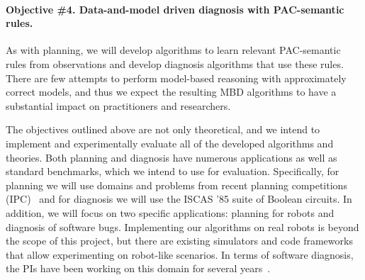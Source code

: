 \documentclass[12pt]{article}
\begin{document}
\paragraph{Objective \#4. Data-and-model driven diagnosis with PAC-semantic rules.} 
As with planning, we will develop algorithms to learn 
relevant PAC-semantic rules from observations and develop diagnosis algorithms that use these rules. There are few attempts to perform model-based reasoning with approximately correct models, and thus we expect the resulting MBD algorithms to have a substantial impact on practitioners and researchers.  







The objectives outlined above are not only theoretical, and we intend to implement and experimentally evaluate all of the developed algorithms and theories. 
Both planning and diagnosis have numerous applications as well as standard benchmarks, which we intend to use for evaluation. Specifically, for planning we will use domains and problems from recent planning competitions (IPC)~\cite{vallati20152014} and for diagnosis we will use the ISCAS '85 suite of Boolean circuits. In addition, we will focus on two specific applications: %
planning for robots and diagnosis of software bugs. 
Implementing our algorithms on real robots is beyond the scope of this project, but there are existing simulators and code frameworks that allow experimenting on robot-like scenarios. In terms of software diagnosis, the PIs have been working on this domain for several years~\cite{Zamir2014UsingMD,elmishali2016dataAugmented,juba2015ndss}. 
\end{document}
